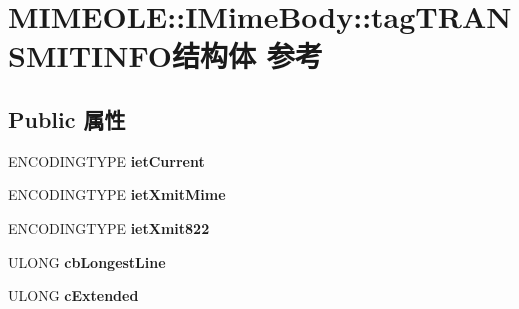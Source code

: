 \hypertarget{struct_m_i_m_e_o_l_e_1_1_i_mime_body_1_1tag_t_r_a_n_s_m_i_t_i_n_f_o}{}\section{M\+I\+M\+E\+O\+LE\+:\+:I\+Mime\+Body\+:\+:tag\+T\+R\+A\+N\+S\+M\+I\+T\+I\+N\+F\+O结构体 参考}
\label{struct_m_i_m_e_o_l_e_1_1_i_mime_body_1_1tag_t_r_a_n_s_m_i_t_i_n_f_o}
\subsection*{Public 属性}
\begin{DoxyCompactItemize}
\item 
\mbox{\label{struct_m_i_m_e_o_l_e_1_1_i_mime_body_1_1tag_t_r_a_n_s_m_i_t_i_n_f_o_a1f2efb10bd0f9a7d93a7a828fcc7935d}} 
E\+N\+C\+O\+D\+I\+N\+G\+T\+Y\+PE {\bfseries iet\+Current}
\item 
\mbox{\label{struct_m_i_m_e_o_l_e_1_1_i_mime_body_1_1tag_t_r_a_n_s_m_i_t_i_n_f_o_a3d0b5d7e464146159cc11865e9919108}} 
E\+N\+C\+O\+D\+I\+N\+G\+T\+Y\+PE {\bfseries iet\+Xmit\+Mime}
\item 
\mbox{\label{struct_m_i_m_e_o_l_e_1_1_i_mime_body_1_1tag_t_r_a_n_s_m_i_t_i_n_f_o_a1f3bc97a8f8d8574070e00ffb4c6eb0a}} 
E\+N\+C\+O\+D\+I\+N\+G\+T\+Y\+PE {\bfseries iet\+Xmit822}
\item 
\mbox{\label{struct_m_i_m_e_o_l_e_1_1_i_mime_body_1_1tag_t_r_a_n_s_m_i_t_i_n_f_o_a17291ea98cbb980f4ee8cd67d33f51c5}} 
U\+L\+O\+NG {\bfseries cb\+Longest\+Line}
\item 
\mbox{\label{struct_m_i_m_e_o_l_e_1_1_i_mime_body_1_1tag_t_r_a_n_s_m_i_t_i_n_f_o_aaeb677ce2398d3ef1e898e647526bc0a}} 
U\+L\+O\+NG {\bfseries c\+Extended}
\item 
\mbox{\label{struct_m_i_m_e_o_l_e_1_1_i_mime_body_1_1tag_t_r_a_n_s_m_i_t_i_n_f_o_a21a47e0b8b19f50fcc11e0415d59fae4}} 

\end{DoxyCompactItemize}
